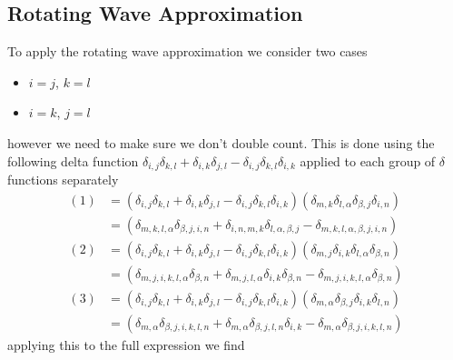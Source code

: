 \subsection{Rotating Wave Approximation}
To apply the rotating wave approximation we consider
two cases
\begin{itemize}
    \item \(i=j\), \(k=l\)
    \item \(i=k\), \(j=l\)
\end{itemize}
however we need to make sure we don't
double count. This is done using
the following delta
function
\(\delta_{i,j}\delta_{k,l}
+ \delta_{i,k}\delta_{j,l}
- \delta_{i,j}\delta_{k,l}
\delta_{i,k}\)
applied to each group of
\(\delta \) functions separately
\begin{align}
    (1) & =  (\delta_{i,j}\delta_{k,l}
    + \delta_{i,k}\delta_{j,l}
    - \delta_{i,j}\delta_{k,l}\delta_{i,k}) (
    \delta_{m, k}\delta_{l, \alpha}
    \delta_{\beta, j}\delta_{i, n})                          \\
        & =  (\delta_{m, k, l, \alpha}\delta_{\beta, j,i, n}
    + \delta_{i, n, m, k}\delta_{l, \alpha, \beta, j}
    - \delta_{m, k, l, \alpha, \beta, j,i, n})               \\
    (2) & =  (\delta_{i,j}\delta_{k,l}
    + \delta_{i,k}\delta_{j,l}
    - \delta_{i,j}\delta_{k,l}
    \delta_{i,k}) (
    \delta_{m, j}\delta_{i, k}
    \delta_{l, \alpha}\delta_{\beta, n})                     \\
        & =  (\delta_{m, j,i, k,l, \alpha}\delta_{\beta, n}
    + \delta_{m, j,l, \alpha}\delta_{i, k}\delta_{\beta, n}
    - \delta_{m, j,i, k, l, \alpha}\delta_{\beta, n} )       \\
    (3) & =  (\delta_{i,j}\delta_{k,l}
    + \delta_{i,k}\delta_{j,l}
    - \delta_{i,j}\delta_{k,l}
    \delta_{i,k}) (
    \delta_{m, \alpha}\delta_{\beta, j}
    \delta_{i, k}\delta_{l, n})                              \\
        & =  (\delta_{m, \alpha}\delta_{\beta, j,i, k, l, n}
    + \delta_{m, \alpha}\delta_{\beta, j,l, n}
    \delta_{i, k}
    - \delta_{m, \alpha}\delta_{\beta, j,i, k,l, n})
\end{align}
applying this to the full expression we find
